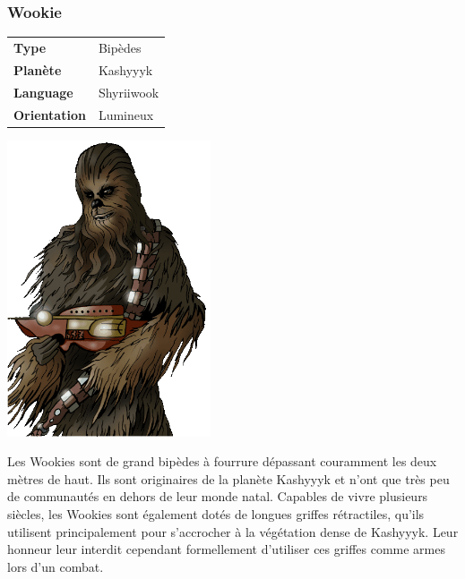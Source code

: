 \subsubsection{Wookie}
\begin{samepage}
	\begin{flushright}
		\begin{tabular}{ l l }
			\textbf{Type} 			& Bipèdes \\
		   	\textbf{Planète} 		& Kashyyyk \\
		   	\textbf{Language} 		& Shyriiwook \\
		   	\textbf{Orientation} 	& Lumineux \\
		\end{tabular}
	\end{flushright}
	\vspace{-6\baselineskip}
	\includegraphics[width=6cm]{img/races/wookie.png}
\end{samepage}

Les Wookies sont de grand bipèdes à fourrure dépassant couramment les deux mètres de haut. Ils sont originaires de la planète Kashyyyk et n'ont que très peu de communautés en dehors de leur monde natal. Capables de vivre plusieurs siècles, les Wookies sont également dotés de longues griffes rétractiles, qu'ils utilisent principalement pour s'accrocher à la végétation dense de Kashyyyk. Leur honneur leur interdit cependant formellement d'utiliser ces griffes comme armes lors d'un combat.

